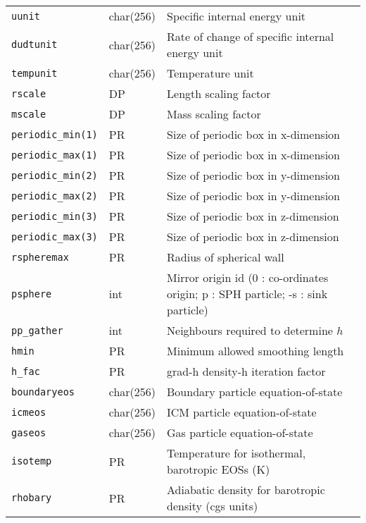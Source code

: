 \documentclass[a4paper]{article}
\newcommand{\var}[1]{\texttt{#1}}
\begin{document}
\begin{center}
\begin{supertabular}{|p{3cm}|p{2cm}|p{8cm}|}
\var{uunit}      & char(256) & Specific internal energy unit \\
\var{dudtunit}   & char(256) & Rate of change of specific internal energy unit \\
\var{tempunit}   & char(256) & Temperature unit \\
\var{rscale}     & DP        & Length scaling factor \\
\var{mscale}     & DP        & Mass scaling factor \\ \hline
\var{periodic\_min(1)} & PR & Size of periodic box in x-dimension \\
\var{periodic\_max(1)} & PR & Size of periodic box in x-dimension \\
\var{periodic\_min(2)} & PR & Size of periodic box in y-dimension \\
\var{periodic\_max(2)} & PR & Size of periodic box in y-dimension \\
\var{periodic\_min(3)} & PR & Size of periodic box in z-dimension \\
\var{periodic\_max(3)} & PR & Size of periodic box in z-dimension \\ 
\var{rspheremax}       & PR & Radius of spherical wall \\ 
\var{psphere}    & int      & Mirror origin id (0 : co-ordinates origin; p : SPH particle; -s : sink particle) \\ \hline
%
\var{pp\_gather} & int      & Neighbours required to determine $h$ \\
\var{hmin}       & PR       & Minimum allowed smoothing length \\
\var{h\_fac}     & PR       & grad-h density-h iteration factor \\ \hline
\var{boundaryeos}& char(256)& Boundary particle equation-of-state \\
\var{icmeos}     & char(256)& ICM particle equation-of-state \\
\var{gaseos}     & char(256)& Gas particle equation-of-state \\
\var{isotemp}    & PR       & Temperature for isothermal, barotropic EOSs (K) \\
\var{rhobary}    & PR       & Adiabatic density for barotropic density (cgs units) \\

\end{supertabular}
\end{center}
\end{document}
